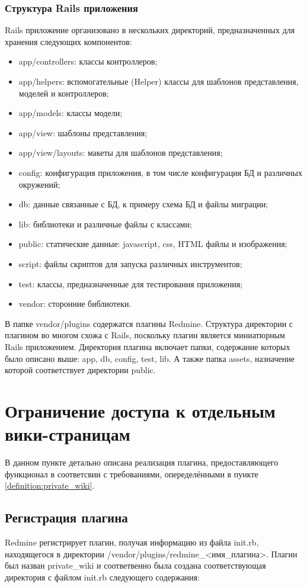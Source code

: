 \subsubsection{Структура Rails приложения}
Rails приложение организовано в нескольких директорий, предназначенных для
хранения следующих компонентов:
\begin{itemize}
\item app/controllers: классы контроллеров;
\item app/helpers: вспомогательные (Helper) классы для шаблонов представления,
моделей и контроллеров;
\item app/models: классы модели;
\item app/view: шаблоны представления;
\item app/view/layouts: макеты для шаблонов представления;
\item config: конфигурация приложения, в том числе конфигурация БД и различных
окружений;
\item db: данные связанные с БД, к примеру схема БД и файлы миграции;
\item lib: библиотеки и различные файлы с классами;
\item public: статические данные: javascript, css, HTML файлы и изображения;
\item script: файлы скриптов для запуска различных инструментов;
\item test: классы, предназначенные для тестирования приложения;
\item vendor: сторонние библиотеки.
\end{itemize}
В папке vendor/plugins содержатся плагины Redmine. Структура директории с
плагином во многом схожа с Rails, поскольку плагин является миниатюрным Rails
приложением. Директория плагина включает папки, содержание которых
было описано выше: app, db, config, test, lib. А также папка assets, назначение
которой соответствует директории public.


\section{Ограничение доступа к отдельным вики-страницам}
\label{section:private_wiki}
В данном пункте детально описана реализация плагина,
предоставляющего функционал в соответсвии с требованиями, опеределёнными
в пункте \ref{definition:private_wiki}.

\subsection{Регистрация плагина}
Redmine регистрирует плагин, получая информацию из файла init.rb, находящегося
в директории /vendor/plugins/redmine\_<имя\_плагина>. Плагин был назван
private\_wiki и соответвенно была создана соответствующая директория с файлом
init.rb следующего содержания:

